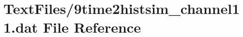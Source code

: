 \hypertarget{9time2histsim__channel11_8dat}{}\section{Text\+Files/9time2histsim\+\_\+channel11.dat File Reference}
\label{9time2histsim__channel11_8dat}
